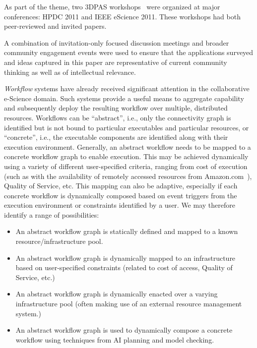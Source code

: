 As part of the theme, two 3DPAS workshops~\cite{3dapas,D3-escience}
were organized at major conferences: HPDC 2011 and IEEE eScience 2011.
These workshops had both peer-reviewed and invited papers.

A combination of invitation-only focused discussion meetings and
broader community engagement events were used to ensure that the
applications surveyed and ideas captured in this paper are
representative of current community thinking as well as of
intellectual relevance.




{\em Workflow} systems have already received significant attention in
the collaborative e-Science domain.  Such systems provide a useful
means to aggregate capability and subsequently deploy the resulting
workflow over multiple, distributed resources. Workflows can be
``abstract'', i.e., only the connectivity graph is identified but is
not bound to particular executables and particular resources, or
``concrete'', i.e., the executable components are identified along
with their execution environment. Generally, an abstract workflow
needs to be mapped to a concrete workflow graph to enable
execution. This may be achieved dynamically using a variety of
different user-specified criteria, ranging from cost of execution
(such as with the availability of remotely accessed resources from
Amazon.com~\cite{berriman11}), Quality of Service, etc. This mapping
can also be adaptive, especially if each concrete workflow is
dynamically composed based on event triggers from the execution
environment or constraints identified by a user. We may therefore
identify a range of possibilities:

\begin{itemize}

\item An abstract workflow graph is statically defined and mapped to a known resource/infrastructure pool.

\item An abstract workflow graph is dynamically mapped to an infrastructure based on user-specified constraints (related to cost of access, Quality of Service, etc.)

\item An abstract workflow graph is dynamically enacted over a varying infrastructure pool (often making use of an external resource management system.)

\item An abstract workflow graph is used to dynamically compose a concrete workflow using techniques from AI planning and model checking.

\end{itemize}

